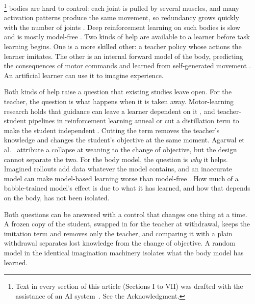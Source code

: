 \documentclass[journal]{IEEEtran}
\begin{document}
\footnote{Text in every section of this article (Sections I to VII) was drafted with the assistance of an AI system~\cite{claude2026}. See the Acknowledgment.} bodies are hard to control: each joint is
pulled by several muscles, and many activation patterns produce the same
movement, so redundancy grows quickly with the number of joints
\cite{bernstein1967}. Deep reinforcement learning on such bodies is slow and is
mostly model-free \cite{berg2023,chiappa2023,schumacher2023}. Two kinds of help
are available to a learner before task learning begins. One is a more skilled
other: a teacher policy whose actions the learner imitates. The other is an
internal forward model of the body, predicting the consequences of motor
commands \cite{wolpert1995,kawato1999} and learned from self-generated
movement \cite{dearden2005}. An artificial learner can use it to imagine
experience.

Both kinds of help raise a question that existing studies leave open. For the
teacher, the question is what happens when it is taken away. Motor-learning
research holds that guidance can leave a learner dependent on it
\cite{salmoni1984,schmidt1992}, and teacher-student pipelines in
reinforcement learning anneal or cut a distillation term to make the student
independent \cite{schmitt2018,agarwal2022}. Cutting the term removes the
teacher's knowledge and changes the student's objective at the same moment.
Agarwal et al.~\cite{agarwal2022} attribute a collapse at weaning to the change
of objective, but the design cannot separate the two. For the
body model, the question is \emph{why} it helps. Imagined rollouts add data
whatever the model contains, and an inaccurate model can make model-based
learning worse than model-free \cite{janner2019,voelcker2022}. How much of a
babble-trained model's effect is due to what it has learned, and how that
depends on the body, has not been isolated.

Both questions can be answered with a control that changes one thing at a
time. A frozen copy of the student, swapped in for the teacher at withdrawal,
keeps the imitation term and removes only the teacher, and comparing it with
a plain withdrawal separates lost knowledge from the change of objective. A
random model in the identical imagination machinery isolates what the body
model has learned.
\end{document}
